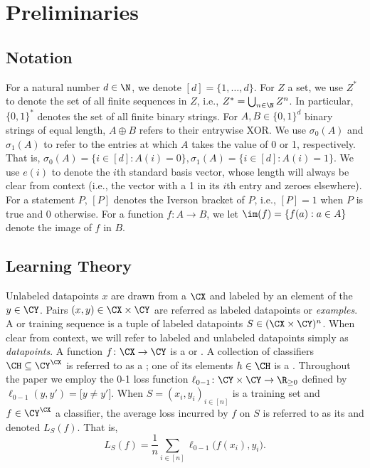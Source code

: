 \section{Preliminaries}\label{Section:Preliminaries}

\subsection{Notation}

For a natural number $d \in \N$, we denote $[d] = \{1, \ldots, d\}$. For $Z$ a set, we use $Z^*$ to denote the set of all finite sequences in $Z$, i.e., $Z^* = \bigcup_{n \in \N} Z^n$. In particular, $\{0,1\}^*$ denotes the set of all finite binary strings. For $A, B \in \{0, 1\}^d$ binary strings of equal length, $A \oplus B$ refers to their entrywise XOR. We use $\sigma_0(A)$ and $\sigma_1(A)$ to refer to the entries at which $A$ takes the value of 0 or 1, respectively. That is, $\sigma_0(A) = \big\{ i \in [d] : A(i) = 0 \big\}, \sigma_1(A) = \big\{ i \in [d] : A(i) = 1 \big\}$.
We use $e(i)$ to denote the $i$th standard basis vector, whose length will always be clear from context (i.e., the vector with a 1 in its $i$th entry and zeroes elsewhere). 
For a statement $P$, $[P]$ denotes the Iverson bracket of $P$, i.e., $[P] = 1$ when $P$ is true and 0 otherwise. For a function $f: A \to B$, we let $\im(f) = \{f(a) : a \in A\}$ denote the image of $f$ in $B$.

\subsection{Learning Theory}

Unlabeled datapoints $x$ are drawn from a  $\CX$ and labeled by an element of the  $y \in \CY$. Pairs $(x, y) \in \CX \times \CY$ are referred as labeled datapoints or \emph{examples}. A  or training sequence is a tuple of labeled datapoints $S \in (\CX \times \CY)^n$. When clear from context, we will refer to labeled and unlabeled datapoints simply as \emph{datapoints}. A function $f \colon \CX \to \CY$ is a  or . A collection of classifiers $\CH \subseteq \CY^\CX$ is referred to as a ; one of its elements $h \in \CH$ is a . Throughout the paper we employ the 0-1 loss function $\ell_{0-1} \colon \CY \times \CY \to \R_{\geq 0}$ defined by $\ell_{0-1}(y, y') = \big[ y \neq y' \big]$.
When $S = (x_i, y_i)_{i \in [n]}$ is a training set and $f \in \CY^\CX$ a classifier, the average loss incurred by $f$ on $S$ is referred to as its  and denoted $L_S(f)$. That is, 
\[ L_S(f) = \frac{1}{n} \sum_{i \in [n]} \ell_{0-1} \big( f(x_i), y_i \big). \]

